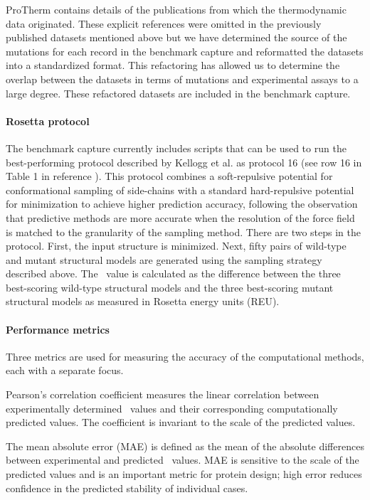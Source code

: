 ProTherm contains details of the publications from which the thermodynamic data originated. These explicit references were omitted in the previously published datasets mentioned above but we have determined the source of the mutations for each record in the benchmark capture and reformatted the datasets into a standardized format. This refactoring has allowed us to determine the overlap between the datasets in terms of mutations and experimental assays to a large degree. These refactored datasets are included in the benchmark capture.

\paragraph{Rosetta protocol}

The benchmark capture currently includes scripts that can be used to run the best-performing protocol described by Kellogg et al. as protocol 16 (see row 16 in Table 1 in reference \cite{kellogg_role_2011}). This protocol combines a soft-repulsive potential for conformational sampling of side-chains with a standard hard-repulsive potential for minimization to achieve higher prediction accuracy, following the observation that predictive methods are more accurate when the resolution of the force field is matched to the granularity of the sampling method. There are two steps in the protocol. First, the input structure is minimized. Next, fifty pairs of wild-type and mutant structural models are generated using the sampling strategy described above. The \ddg\ value is calculated as the difference between the three best-scoring wild-type structural models and the three best-scoring mutant structural models as measured in Rosetta energy units (REU).

\paragraph{Performance metrics}

Three metrics are used for measuring the accuracy of the computational methods, each with a separate focus.

Pearson's correlation coefficient measures the linear correlation between experimentally determined \ddg\ values and their corresponding computationally predicted values. The coefficient is invariant to the scale of the predicted values.

The mean absolute error (MAE) is defined as the mean of the absolute differences between experimental and predicted \ddg\ values. MAE is sensitive to the scale of the predicted values and is an important metric for protein design; high error reduces confidence in the predicted stability of individual cases.

